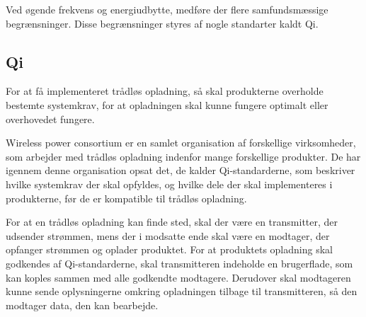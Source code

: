 Ved øgende frekvens og energiudbytte, medføre der flere samfundsmæssige begrænsninger. Disse begrænsninger styres af nogle standarter kaldt Qi. 

\subsection{Qi}
For at få implementeret trådløs opladning, så skal produkterne overholde bestemte systemkrav, for at opladningen skal kunne fungere optimalt eller overhovedet fungere.

Wireless power consortium er en samlet organisation af forskellige virksomheder, som arbejder med trådløs opladning indenfor mange forskellige produkter. De har igennem denne organisation opsat det, de kalder Qi-standarderne, som beskriver hvilke systemkrav der skal opfyldes, og hvilke dele der skal implementeres i produkterne, før de er kompatible til trådløs opladning.

For at en trådløs opladning kan finde sted, skal der være en transmitter, der udsender strømmen, mens der i modsatte ende skal være en modtager, der opfanger strømmen og oplader produktet. For at produktets opladning skal godkendes af Qi-standarderne, skal transmitteren indeholde en brugerflade, som kan koples sammen med alle godkendte modtagere. Derudover skal modtageren kunne sende oplysningerne omkring opladningen tilbage til transmitteren, så den modtager data, den kan bearbejde.
\newpage